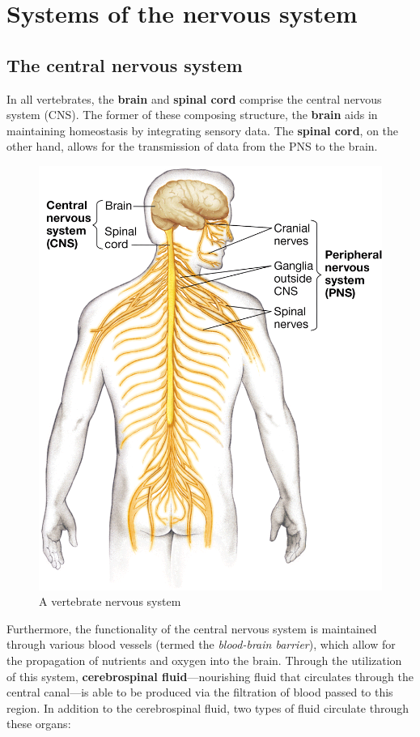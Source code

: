 \documentclass{article}
\begin{document}
\section{Systems of the nervous system}

\subsection{The central nervous system}

In all vertebrates, the \textbf{brain} and \textbf{spinal cord} comprise the
central nervous system (CNS). The former of these composing structure, the
\textbf{brain} aids in maintaining homeostasis by integrating sensory data.
The \textbf{spinal cord}, on the other hand, allows for the transmission of
data from the PNS to the brain.

\begin{figure}[h]
	\centering
	\includegraphics[width=0.7\linewidth]{nervous_system.png}
	\caption{A vertebrate nervous system}
\end{figure}

Furthermore, the functionality of the central nervous system is maintained
through various blood vessels (termed the \emph{blood-brain barrier}), which
allow for the propagation of nutrients and oxygen into the brain. Through
the utilization of this system, \textbf{cerebrospinal fluid}---nourishing fluid
that circulates through the central canal---is able to be produced via the
filtration of blood passed to this region. In addition to the cerebrospinal
fluid, two types of fluid circulate through these organs:
\end{document}
